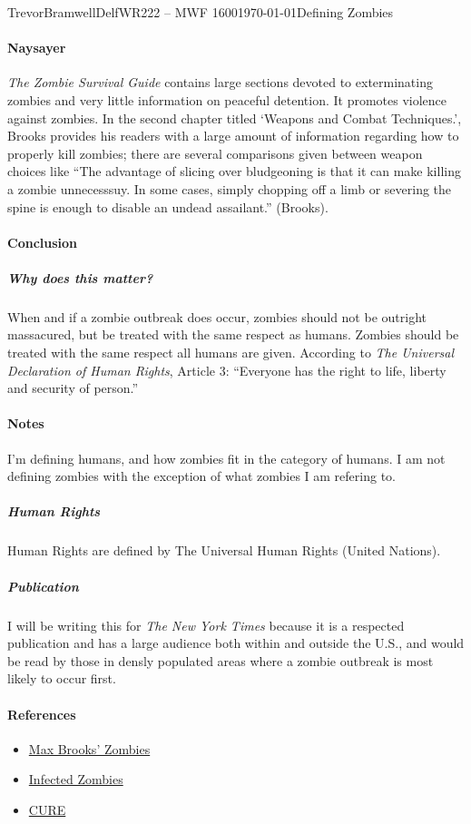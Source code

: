 \documentclass[12pt,letterpaper]{article}
\begin{document}
\begin{mla}{Trevor}{Bramwell}{Delf}{WR222 -- MWF 1600}{\today}{Defining Zombies}
\paragraph{Naysayer}
\emph{The Zombie Survival Guide} contains large sections devoted to
exterminating zombies and very little information on peaceful detention.
It promotes violence against zombies. In the second chapter titled `Weapons and
Combat Techniques.', Brooks provides his readers with a large amount of
information regarding how to properly kill zombies; there are several
comparisons given between weapon choices like ``The advantage of slicing over
bludgeoning is that it can make killing a zombie unnecesssuy. In some cases,
simply chopping off a limb or severing the spine is enough to disable an
undead assailant.'' (Brooks).

\paragraph{Conclusion}
\subparagraph{Why does this matter?}
When and if a zombie outbreak does occur, zombies should not be outright
massacured, but be treated with the same respect as humans. Zombies should be
treated with the same respect all humans are given.
According to \emph{The Universal Declaration of Human Rights}, Article 3:
``Everyone has the right to life, liberty and security of person.''

\paragraph{Notes}
I'm defining humans, and how zombies fit in the category of humans.
I am not defining zombies with the exception of what zombies I am refering to.

\subparagraph{Human Rights}
Human Rights are defined by The Universal Human Rights (United Nations).

\subparagraph{Publication}
I will be writing this for \emph{The New York Times} because it is a respected
publication and has a large audience both within and outside the U.S., and
would be read by those in densly populated areas where a zombie outbreak is
most likely to occur first.



\paragraph{References}
\begin{itemize}
\item
\href{http://zombie.wikia.com/wiki/Zombies\_(Max\_Brooks)}{Max Brooks' Zombies}
\item
\href{http://zombie.wikia.com/wiki/Infected}{Infected Zombies}
\item
\href{http://www.citizensfortheundead.com/about.html}{CURE}
\end{itemize}


\end{mla}
\end{document}
